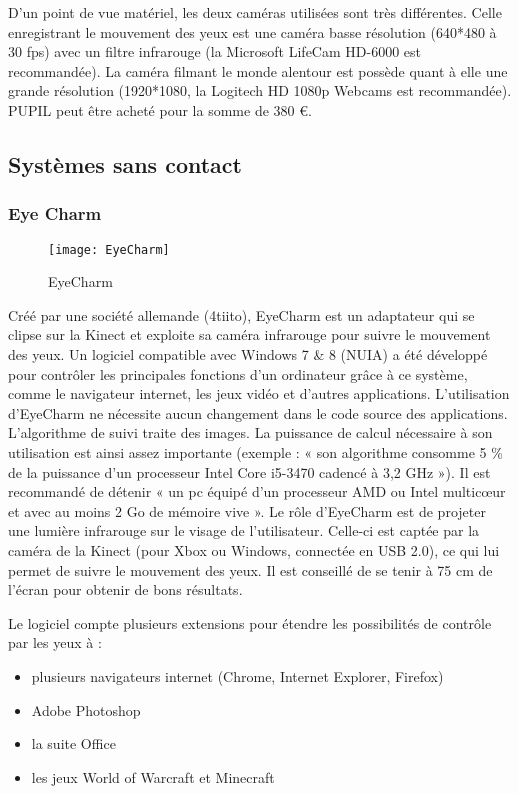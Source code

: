 D’un point de vue matériel, les deux caméras utilisées sont très différentes.
Celle enregistrant le mouvement des yeux est une caméra basse résolution (640*480 à 30 fps) avec un filtre infrarouge (la  Microsoft LifeCam HD-6000 est recommandée). La caméra filmant le monde alentour est possède quant à elle une grande résolution (1920*1080, la Logitech HD 1080p Webcams est recommandée).
PUPIL peut être acheté pour la somme de 380 \euro{}.

\subsection{Systèmes sans contact}

\subsubsection{Eye Charm}

\begin{figure}[h]
  \centering
  \texttt{[image: EyeCharm]}
  \caption{EyeCharm}
  \label{fig:EyeCharm}
\end{figure}

Créé par une société allemande (4tiito), EyeCharm est un adaptateur qui se clipse sur la Kinect et exploite sa caméra infrarouge pour suivre le mouvement des yeux. Un logiciel compatible avec Windows 7 \& 8 (NUIA) a été développé pour contrôler les principales fonctions d’un ordinateur grâce à ce système, comme le navigateur internet, les jeux vidéo et d’autres applications. L’utilisation d’EyeCharm ne nécessite aucun changement dans le code source des applications.
L’algorithme de suivi traite des images. La puissance de calcul nécessaire à son utilisation est ainsi assez importante (exemple : « son algorithme consomme 5 \% de la puissance d’un processeur Intel Core i5-3470 cadencé à 3,2 GHz »). Il est recommandé de détenir « un pc équipé d’un processeur AMD ou Intel multicœur et avec au moins 2 Go de mémoire vive ».
Le rôle d’EyeCharm est de projeter une lumière infrarouge sur le visage de l’utilisateur. Celle-ci est captée par la caméra de la Kinect (pour Xbox ou Windows, connectée en USB 2.0), ce qui lui permet de suivre le mouvement des yeux. Il est conseillé de se tenir à 75 cm de l’écran pour obtenir de bons résultats.

Le logiciel compte plusieurs extensions pour étendre les possibilités de contrôle par les yeux à :
\begin{itemize}[label=\textbullet,font=\color{black}]
\item plusieurs navigateurs internet (Chrome, Internet Explorer, Firefox)
\item Adobe Photoshop
\item la suite Office
\item les jeux World of Warcraft et Minecraft
\end{itemize}

